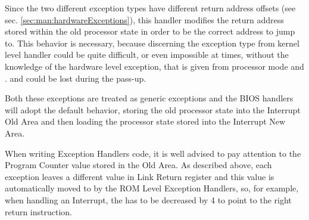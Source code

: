 Since the two different exception types have different return address offsets (see sec. \ref{sec:man:hardwareExceptions}), this handler modifies the return address stored within the old processor state in order to be the correct address to jump to.
This behavior is necessary, because discerning the exception type from kernel level handler could be quite difficult, or even impossible at times, without the knowledge of the hardware level exception, that is given from processor mode and . and could be lost during the pass-up.


Both these exceptions are treated as generic exceptions and the BIOS handlers will adopt the default behavior, storing the old processor state into the Interrupt Old Area and then loading the processor state stored into the Interrupt New Area.


When writing Exception Handlers code, it is well advised to pay attention to the Program Counter value stored in the Old Area.
As described above, each exception leaves a different value in Link Return register and this value is automatically moved to  by the ROM Level Exception Handlers, so, for example, when handling an Interrupt, the  has to be decreased by 4 to point to the right return instruction.
